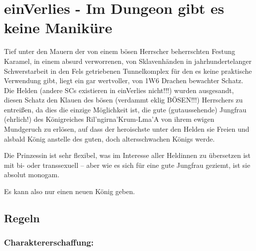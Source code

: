 
\section{einVerlies - Im Dungeon gibt es keine Maniküre}
Tief unter den Mauern der von einem bösen Herrscher beherrschten Festung Karamel, in einem absurd verworrenen, von Sklavenhänden in jahrhundertelanger Schwerstarbeit in den Fels getriebenen Tunnelkomplex für den es keine praktische Verwendung gibt, liegt ein gar wertvoller, von 1W6 Drachen bewachter Schatz. Die Helden (andere SCs existieren in einVerlies nicht!!!) wurden ausgesandt, diesen Schatz den Klauen des bösen (verdammt eklig BÖSEN!!!) Herrschers zu entreißen, da dies die einzige Möglichkeit ist, die gute (gutaussehende) Jungfrau (ehrlich!) des Königreiches Ril'ngirna'Krum-Lma'A von ihrem ewigen Mundgeruch zu erlösen, auf dass der heroischste unter den Helden sie Freien und alsbald König anstelle des guten, doch altersschwachen Königs werde.

Die Prinzessin ist sehr flexibel, was im Interesse aller Heldinnen zu übersetzen ist mit bi- oder transsexuell -- aber wie es sich für eine gute Jungfrau geziemt, ist sie absolut monogam.

Es kann also nur einen neuen König geben.

 

\subsection{Regeln}

\subsubsection{Charaktererschaffung:}

